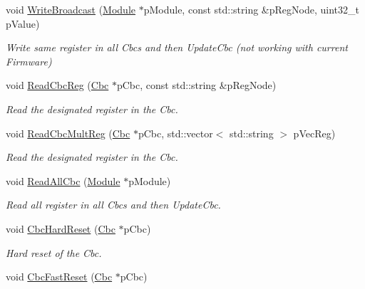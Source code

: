 void \hyperlink{class_ph2___hw_interface_1_1_cbc_interface_a81a03fe5d5d0791ff1b2cab92f6fbcdd}{Write\-Broadcast} (\hyperlink{class_ph2___hw_description_1_1_module}{Module} $\ast$p\-Module, const std\-::string \&p\-Reg\-Node, uint32\-\_\-t p\-Value)
\begin{DoxyCompactList}\small\item\em Write same register in all Cbcs and then Update\-Cbc (not working with current Firmware) \end{DoxyCompactList}\item 
void \hyperlink{class_ph2___hw_interface_1_1_cbc_interface_aa879b96566ef29a56b606f6cb65c8656}{Read\-Cbc\-Reg} (\hyperlink{class_ph2___hw_description_1_1_cbc}{Cbc} $\ast$p\-Cbc, const std\-::string \&p\-Reg\-Node)
\begin{DoxyCompactList}\small\item\em Read the designated register in the Cbc. \end{DoxyCompactList}\item 
void \hyperlink{class_ph2___hw_interface_1_1_cbc_interface_a74baf6bc4fb08739c1477de0b75de9c9}{Read\-Cbc\-Mult\-Reg} (\hyperlink{class_ph2___hw_description_1_1_cbc}{Cbc} $\ast$p\-Cbc, std\-::vector$<$ std\-::string $>$ p\-Vec\-Reg)
\begin{DoxyCompactList}\small\item\em Read the designated register in the Cbc. \end{DoxyCompactList}\item 
void \hyperlink{class_ph2___hw_interface_1_1_cbc_interface_a5a2e404039cef52b294cacfa7e667f49}{Read\-All\-Cbc} (\hyperlink{class_ph2___hw_description_1_1_module}{Module} $\ast$p\-Module)
\begin{DoxyCompactList}\small\item\em Read all register in all Cbcs and then Update\-Cbc. \end{DoxyCompactList}\item 
void \hyperlink{class_ph2___hw_interface_1_1_cbc_interface_a0e9a7f5c0a444cb8ca14f3a90cd9e759}{Cbc\-Hard\-Reset} (\hyperlink{class_ph2___hw_description_1_1_cbc}{Cbc} $\ast$p\-Cbc)
\begin{DoxyCompactList}\small\item\em Hard reset of the Cbc. \end{DoxyCompactList}\item 
void \hyperlink{class_ph2___hw_interface_1_1_cbc_interface_ae2166f5bd24481d88bdd015d1db08051}{Cbc\-Fast\-Reset} (\hyperlink{class_ph2___hw_description_1_1_cbc}{Cbc} $\ast$p\-Cbc)
